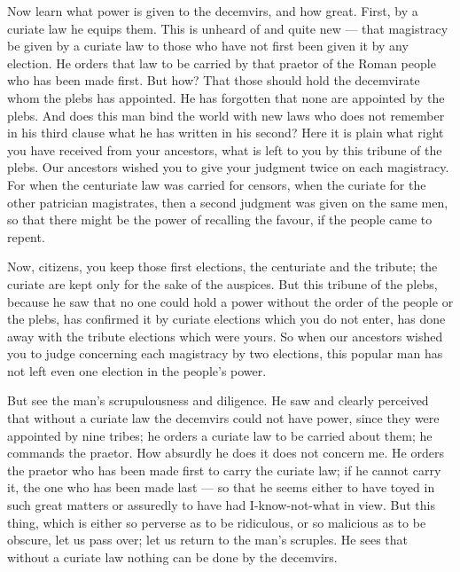  Now learn what power is given to the decemvirs, and how great. First, by a curiate law he equips them. This is unheard of and quite new --- that magistracy be given by a curiate law to those who have not first been given it by any election. He orders that law to be carried by that praetor of the Roman people who has been made first. But how? That those should hold the decemvirate whom the plebs has appointed. He has forgotten that none are appointed by the plebs. And does this man bind the world with new laws who does not remember in his third clause what he has written in his second? Here it is plain what right you have received from your ancestors, what is left to you by this tribune of the plebs. Our ancestors wished you to give your judgment twice on each magistracy. For when the centuriate law was carried for censors, when the curiate for the other patrician magistrates, then a second judgment was given on the same men, so that there might be the power of recalling the favour, if the people came to repent.

 Now, citizens, you keep those first elections, the centuriate and the tribute; the curiate are kept only for the sake of the auspices. But this tribune of the plebs, because he saw that no one could hold a power without the order of the people or the plebs, has confirmed it by curiate elections which you do not enter, has done away with the tribute elections which were yours. So when our ancestors wished you to judge concerning each magistracy by two elections, this popular man has not left even one election in the people's power.

 But see the man's scrupulousness and diligence. He saw and clearly perceived that without a curiate law the decemvirs could not have power, since they were appointed by nine tribes; he orders a curiate law to be carried about them; he commands the praetor. How absurdly he does it does not concern me. He orders the praetor who has been made first to carry the curiate law; if he cannot carry it, the one who has been made last --- so that he seems either to have toyed in such great matters or assuredly to have had I-know-not-what in view. But this thing, which is either so perverse as to be ridiculous, or so malicious as to be obscure, let us pass over; let us return to the man's scruples. He sees that without a curiate law nothing can be done by the decemvirs.

